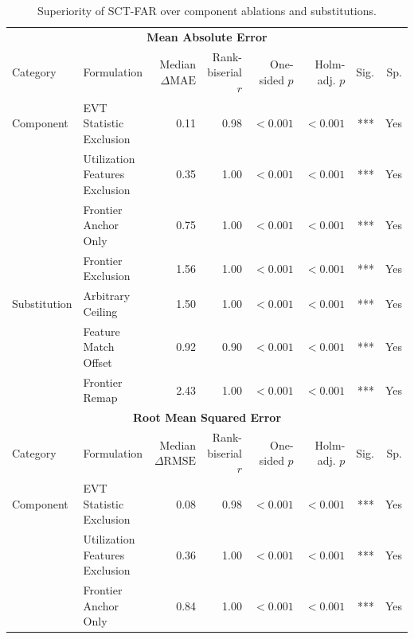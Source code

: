 \documentclass{article}
\begin{document}
\clearpage
\begin{table}[H]
\centering
\footnotesize
\captionsetup{position=top,skip=12pt}
\caption{Superiority of SCT-FAR over component ablations and substitutions.}
\label{tab:si-superiority}
\setlength{\tabcolsep}{2pt}
\renewcommand{\arraystretch}{1.0}
\begin{tabularx}{\linewidth}{@{}l>{\raggedright\arraybackslash}Xrrrrrr@{}}
\toprule
\multicolumn{8}{c}{\textbf{Mean Absolute Error}} \\
\cmidrule(lr){1-8}
Category & Formulation & \shortstack{Median\\$\Delta\mathrm{MAE}$} & \shortstack{Rank-biserial\\$r$} & \shortstack{One-sided\\$p$} & \shortstack{Holm-adj.\\$p$} & Sig. & Sp. \\
\midrule
Component & EVT Statistic Exclusion & 0.11 & 0.98 & $<0.001$ & $<0.001$ & *** & Yes \\
 & Utilization Features Exclusion & 0.35 & 1.00 & $<0.001$ & $<0.001$ & *** & Yes \\
 & Frontier Anchor Only & 0.75 & 1.00 & $<0.001$ & $<0.001$ & *** & Yes \\
 & Frontier Exclusion & 1.56 & 1.00 & $<0.001$ & $<0.001$ & *** & Yes \\
\addlinespace
Substitution & Arbitrary Ceiling & 1.50 & 1.00 & $<0.001$ & $<0.001$ & *** & Yes \\
 & Feature Match Offset & 0.92 & 0.90 & $<0.001$ & $<0.001$ & *** & Yes \\
 & Frontier Remap & 2.43 & 1.00 & $<0.001$ & $<0.001$ & *** & Yes \\
\midrule
\multicolumn{8}{c}{\textbf{Root Mean Squared Error}} \\
\cmidrule(lr){1-8}
Category & Formulation & \shortstack{Median\\$\Delta\mathrm{RMSE}$} & \shortstack{Rank-biserial\\$r$} & \shortstack{One-sided\\$p$} & \shortstack{Holm-adj.\\$p$} & Sig. & Sp. \\
\midrule
Component & EVT Statistic Exclusion & 0.08 & 0.98 & $<0.001$ & $<0.001$ & *** & Yes \\
 & Utilization Features Exclusion & 0.36 & 1.00 & $<0.001$ & $<0.001$ & *** & Yes \\
 & Frontier Anchor Only & 0.84 & 1.00 & $<0.001$ & $<0.001$ & *** & Yes \\

\end{tabularx}
\end{table}
\end{document}
